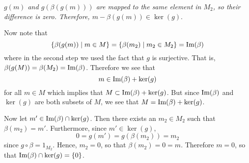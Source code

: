 \begin{prf}
\begin{description}
\begin{center}

            \textit{$g(m)$ and $g(\beta(g(m)))$ are mapped to the same element in $M_2$, so their difference is zero. Therefore, $m - \beta(g(m)) \in \ker(g).$}

        \end{center}
        
        Now note that 
        \[
            \{ \beta(g(m)) \mid m \in M\} = \{\beta(m_2) \mid m_2 \in M_2\} = \mbox{Im}(\beta)
        \]
        where in the second step we used the fact that $g$ is
        surjective. That is, $\beta(g(M)) = \beta(M_2) = \mbox{Im}(\beta)$. Therefore we see that 
        \[ 
            m \in \mbox{Im}(\beta) + \ker(g)
        \]
        for all $m \in M$ which implies that 
        $M \subset \mbox{Im}(\beta) + \ker(g)$. But since $\mbox{Im}(\beta)$
        and $\ker(g)$ are both subsets of $M$, we see that $M =
        \mbox{Im}(\beta) + \ker(g)$. 

        Now let $m' \in \mbox{Im}(\beta) \cap \ker(g)$. Then there
        exists an $m_2 \in M_2$ such that $\beta(m_2) = m'$.
        Furthermore, since $m' \in \ker(g)$, 
        \[
            0 = g(m') = g(\beta(m_2)) = m_2
        \]
        since $g \circ \beta = 1_{M_2}$. Hence, $m_2 = 0$, so that
        $\beta(m_2) = 0 = m$. Therefore $m = 0$, so that
        $\mbox{Im}(\beta) \cap \ker(g) = \{0\}$. 
        \begin{center}
\end{center}
\end{description}
\end{prf}

